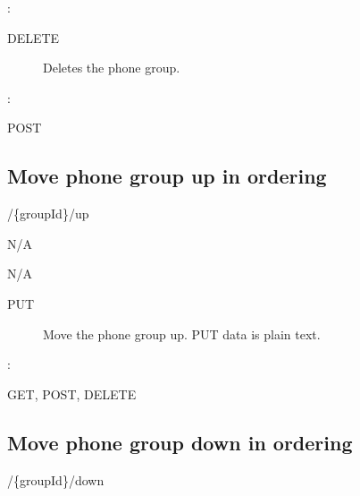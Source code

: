 \documentclass[letterpaper,10pt,english]{sphinxmanual}
\begin{document}
:

\begin{sphinxVerbatim}[commandchars=\\\{\}]
\end{sphinxVerbatim}
\begin{description}
\item[{ DELETE}] \leavevmode
Deletes the phone group.

\end{description}

:

\begin{sphinxVerbatim}[commandchars=\\\{\}]
\end{sphinxVerbatim}

 POST


\subsection{Move phone group up in ordering}
\label{\detokenize{restapi:move-phone-group-up-in-ordering}}
 /\{groupId\}/up

 N/A

 N/A
\begin{description}
\item[{ PUT}] \leavevmode
Move the phone group up. PUT data is plain text.

\end{description}

:

\begin{sphinxVerbatim}[commandchars=\\\{\}]
\end{sphinxVerbatim}

 GET, POST, DELETE


\subsection{Move phone group down in ordering}
\label{\detokenize{restapi:move-phone-group-down-in-ordering}}
 /\{groupId\}/down
\end{document}
